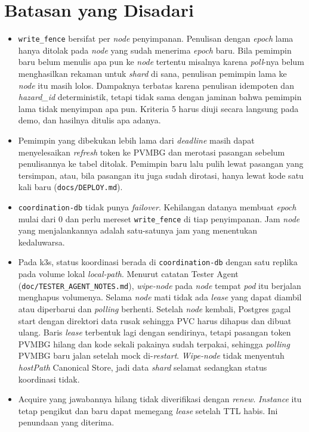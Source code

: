 \section{Batasan yang Disadari}

\begin{itemize}
\item \texttt{write\_fence} bersifat per \textit{node} penyimpanan. Penulisan dengan \textit{epoch} lama hanya ditolak pada \textit{node} yang sudah menerima \textit{epoch} baru. Bila pemimpin baru belum menulis apa pun ke \textit{node} tertentu misalnya karena \textit{poll}-nya belum menghasilkan rekaman untuk \textit{shard} di sana, penulisan pemimpin lama ke \textit{node} itu masih lolos. Dampaknya terbatas karena penulisan idempoten dan \textit{hazard\_id} deterministik, tetapi tidak sama dengan jaminan bahwa pemimpin lama tidak menyimpan apa pun. Kriteria 5 harus diuji secara langsung pada demo, dan hasilnya ditulis apa adanya.
\item Pemimpin yang dibekukan lebih lama dari \textit{deadline} masih dapat menyelesaikan \textit{refresh} token ke PVMBG dan merotasi pasangan sebelum penulisannya ke tabel ditolak. Pemimpin baru lalu pulih lewat pasangan yang tersimpan, atau, bila pasangan itu juga sudah dirotasi, hanya lewat kode satu kali baru (\texttt{docs/DEPLOY.md}).
\item \texttt{coordination-db} tidak punya \textit{failover}. Kehilangan datanya membuat \textit{epoch} mulai dari 0 dan perlu mereset \texttt{write\_fence} di tiap penyimpanan. Jam \textit{node} yang menjalankannya adalah satu-satunya jam yang menentukan kedaluwarsa.
\item Pada k3s, status koordinasi berada di \texttt{coordination-db} dengan satu replika pada volume lokal \textit{local-path}. Menurut catatan Tester Agent (\texttt{doc/TESTER\_AGENT\_NOTES.md}), \textit{wipe-node} pada \textit{node} tempat \textit{pod} itu berjalan menghapus volumenya. Selama \textit{node} mati tidak ada \textit{lease} yang dapat diambil atau diperbarui dan \textit{polling} berhenti. Setelah \textit{node} kembali, Postgres gagal start dengan direktori data rusak sehingga PVC harus dihapus dan dibuat ulang. Baris \textit{lease} terbentuk lagi dengan sendirinya, tetapi pasangan token PVMBG hilang dan kode sekali pakainya sudah terpakai, sehingga \textit{polling} PVMBG baru jalan setelah mock di-\textit{restart}. \textit{Wipe-node} tidak menyentuh \textit{hostPath} Canonical Store, jadi data \textit{shard} selamat sedangkan status koordinasi tidak.
\item Acquire yang jawabannya hilang tidak diverifikasi dengan \textit{renew}. \textit{Instance} itu tetap pengikut dan baru dapat memegang \textit{lease} setelah TTL habis. Ini penundaan yang diterima.

\end{itemize}

